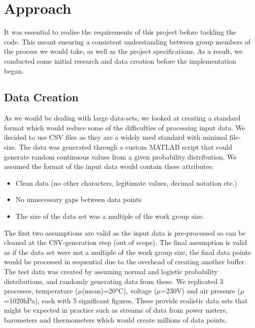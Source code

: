
\section{Approach}

It was essential to realise the requirements of this project before tackling the code. This meant ensuring a consistent understanding between group members of the process we would take, as well as the project specifications. As a result, we conducted some initial research and data creation before the implementation began.

\subsection{Data Creation}

As we would be dealing with large data-sets, we looked at creating a standard format which would reduce some of the difficulties of processing input data. We decided to use CSV files as they are a widely used standard with minimal file-size. The data was generated through a custom MATLAB script that could generate random continuous values from a given probability distribution. We assumed the format of the input data would contain these attributes:
\begin{itemize}
    \setlength\itemsep{0pt}
    \item Clean data (no other characters, legitimate values, decimal notation etc.)
    \item No unnecessary gaps between data points
    \item The size of the data set was a multiple of the work group size.
\end{itemize}
The first two assumptions are valid as the input data is pre-processed so can be cleaned at the CSV-generation step (out of scope). The final assumption is valid as if the data set were not a multiple of the work group size, the final data points would be processed in sequential due to the overhead of creating another buffer. The test data was created by assuming normal and logistic probability distributions, and randomly generating data from these. We replicated 3 processes, temperature ($\mu$(mean)=20°C), voltage ($\mu$=230V) and air pressure ($\mu$=1020hPa), each with 5 significant figures. These provide realistic data sets that might be expected in practice such as streams of data from power meters, barometers and thermometers which would create millions of data points.

